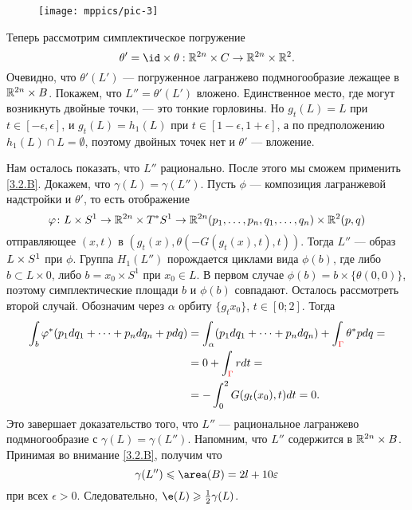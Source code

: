 \begin{figure}[ht!]
\vskip-0mm
\centering
\texttt{[image: mppics/pic-3]}
\caption{}\label{pic-3}
\vskip0mm
\end{figure}

Теперь рассмотрим симплектическое погружение 
\[\theta' = \id \times \theta: \RR^{2n} \times C \to \RR^{2n} \times \RR^2.\]
Очевидно, что $\theta' (L')$ --- погруженное лагранжево подмногообразие лежащее в $\mathbb{R}^{2n} \times B$. 
Покажем, что $L'' = \theta' (L')$ вложено.
Единственное место, где могут возникнуть двойные точки, --- это тонкие горловины.
Но $g_t (L) = L$ при $t \in [-\epsilon, \epsilon]$, 
и $g_t (L) = h_1 (L)$ при $t \in [1 - \epsilon, 1 + \epsilon]$, а по предположению $h_1 (L) \cap L = \emptyset$, поэтому двойных точек нет и $\theta'$ --- вложение.

Нам осталось показать, что $L''$ рационально.
После этого мы сможем применить \ref{3.2.B}.
Докажем, что $\gamma (L) = \gamma (L'')$.
Пусть $\phi$ --- композиция лагранжевой надстройки и $\theta'$,
то есть отображение 
\[\varphi\colon 
L \times S^1
\to
\mathbb{R}^{2n} \times T^\ast S^1
\to
\mathbb{R}^{2n} (p_1,\dots, p_n, q_1,\dots, q_n) \times \mathbb{R}^2 (p, q)\]
отправляющее $(x, t)$ в $(g_t (x), \theta (-G (g_t (x), t), t))$.
Тогда $L''$ --- образ $L \z\times S^1$ при $\phi$.
Группа $H_1 (L'')$ порождается циклами вида $\phi (b)$, где либо $b \subset L \times {0}$, либо $b = {x_0} \times S^1$ при $x_0 \in L$.
В первом случае $\phi (b) = b \times \{\theta (0, 0)\}$, поэтому симплектические площади $b$ и $\phi (b)$ совпадают.
Осталось рассмотреть второй случай.
Обозначим через $\alpha$ орбиту $\{g_t x_0\}$, $t \in [0; 2]$.
Тогда
\begin{align*}
\int_b\phi^\ast (p_1 dq_1 +\dots
+ p_n dq_n + pdq)
&= \int_\alpha (p_1 dq_1 +\dots
+ p_n dq_n) + \int_{\red{\Gamma}}\theta^\ast pdq =
\\
&= 0 + \int_{\red{\Gamma}} rdt =
\\
&= - \int_0^2G (g_t (x_0), t) dt 
= 0.
\end{align*}
Это завершает доказательство того, что $L''$ --- рациональное лагранжево подмногообразие с $\gamma (L) = \gamma (L'')$.
Напомним, что $L''$ содержится в $\mathbb{R}^{2n} \times B$.
Принимая во внимание \ref{3.2.B}, получим что
\[\gamma (L'') \le \area (B) = 2l + 10\epsilon\]
при всех $\epsilon> 0$.
Следовательно, $\e(L) \ge \tfrac12 \gamma (L)$.
\qeds

